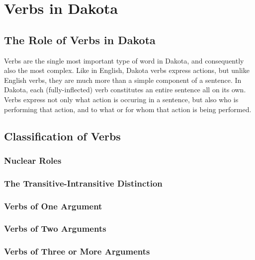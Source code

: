 \chapter{Verbs in Dakota}\label{ch:verbs}
  

  \section{The Role of Verbs in Dakota}

Verbs are the single most important type of word in Dakota, and consequently also the most complex.  Like in English, Dakota verbs express actions, but unlike English verbs, they are much more than a simple component of a sentence.  In Dakota, each (fully-inflected) verb constitutes an entire sentence all on its own.  Verbs express not only what action is occuring in a sentence, but also who is performing that action, and to what or for whom that action is being performed.  
    


    
    \section{Classification of Verbs}
 
 	\subsection{Nuclear Roles}

 	\subsection{The Transitive-Intransitive Distinction}

	 \subsection{Verbs of One Argument}

	\subsection{Verbs of Two Arguments}

	\subsection{Verbs of Three or More Arguments}